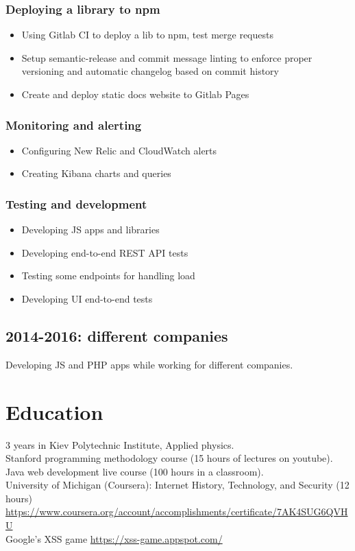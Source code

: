 \documentclass[a4paper, 14pt]{article}
\begin{document}
		\subsubsection{Deploying a library to npm}
			\begin{itemize}
				\item Using Gitlab CI to deploy a lib to npm, test merge requests \\
				\item Setup semantic-release and commit message linting to enforce proper versioning and automatic changelog based on commit history \\
				\item Create and deploy static docs website to Gitlab Pages
			\end{itemize}

		\subsubsection{Monitoring and alerting}
			\begin{itemize}
				\item Configuring New Relic and CloudWatch alerts \\
				\item Creating Kibana charts and queries
			\end{itemize}

		\subsubsection{Testing and development}
			\begin{itemize}
				\item Developing JS apps and libraries \\
				\item Developing end-to-end REST API tests \\
				\item Testing some endpoints for handling load \\
				\item Developing UI end-to-end tests
			\end{itemize}

  \subsection{2014-2016: different companies}
    Developing JS and PHP apps while working for different companies.

\section{Education}
	3 years in Kiev Polytechnic Institute, Applied physics. \\
	Stanford programming methodology course (15 hours of lectures on youtube). \\
	Java web development live course (100 hours in a classroom). \\
  University of Michigan (Coursera): Internet History, Technology, and Security (12 hours) \url{https://www.coursera.org/account/accomplishments/certificate/7AK4SUG6QVHU} \\
  Google's XSS game \url{https://xss-game.appspot.com/}
\end{document}
